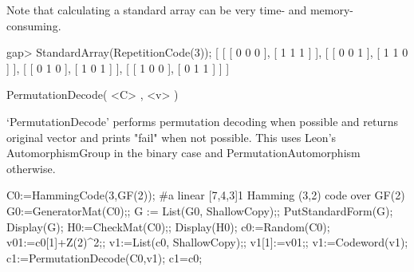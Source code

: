 Note   that calculating a standard  array  can be  very time- and memory-
consuming.

\beginexample
gap> StandardArray(RepetitionCode(3)); 
[ [ [ 0 0 0 ], [ 1 1 1 ] ], [ [ 0 0 1 ], [ 1 1 0 ] ], 
  [ [ 0 1 0 ], [ 1 0 1 ] ], [ [ 1 0 0 ], [ 0 1 1 ] ] ]
\endexample

\> PermutationDecode( <C> , <v> )

`PermutationDecode' performs permutation decoding when possible
and returns original vector and prints "fail" when not possible.
This uses Leon's AutomorphismGroup in the binary case and
PermutationAutomorphism otherwise. 

\beginexample
C0:=HammingCode(3,GF(2));
#a linear [7,4,3]1 Hamming (3,2) code over GF(2)
G0:=GeneratorMat(C0);;
G := List(G0, ShallowCopy);;
PutStandardForm(G);
Display(G);
H0:=CheckMat(C0);;
Display(H0);
c0:=Random(C0);
v01:=c0[1]+Z(2)^2;;
v1:=List(c0, ShallowCopy);;
v1[1]:=v01;;
v1:=Codeword(v1);
c1:=PermutationDecode(C0,v1);
c1=c0;
\endexample

